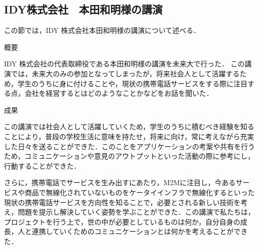 \subsection{IDY株式会社　本田和明様の講演}
\par
この節では，IDY 株式会社本田和明様の講演について述べる．
\par
概要
\par
IDY 株式会社の代表取締役である本田和明様の講演を未来大で行った． この講演では，未来大のみの参加となってしまったが，将来社会人として活躍するため，学生のうちに身に付けることや，現状の携帯電話サービスをする際に注目する点，会社を経営するとはどのようなことかなどをお話を聞いた．
\par
成果
\par
この講演では社会人として活躍していくため，学生のうちに積むべき経験を知ることにより，普段の学校生活に意味を持たせ，将来に向け，常に考えながら充実した日々を送ることができた．このことをアプリケーションの考案や共有を行うため，コミュニケーションや意見のアウトプットといった活動の際に参考にし，行動することができた．
\par
さらに，携帯電話でサービスを生み出すにあたり，M2Mに注目し，今あるサービスや商品で無線化されていないものをケータイインフラで無線化するといった現状の携帯電話サービスを方向性を知ることで，必要とされる新しい技術を考え，問題を提示し解決していく姿勢を学ぶことができた．この講演で私たちは，プロジェクトを行う上で，世の中が必要としているものは何か，自分自身の成長，人と連携していくためのコミュニケーションとは何かを考えることができた．
